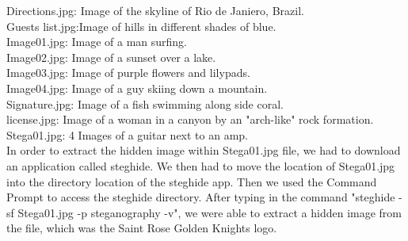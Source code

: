 \documentclass[12ptletterpaper]{paper}
\newcommand\tab[1][1cm]{\hspace*{#1}}
\begin{document}
\begin{flushleft}
		\tab Directions.jpg: Image of the skyline of Rio de Janiero, Brazil.\\
		\tab Guests list.jpg:Image of hills in different shades of blue.\\
		\tab Image01.jpg: Image of a man surfing.\\
		\tab Image02.jpg: Image of a sunset over a lake.\\
		\tab Image03.jpg: Image of purple flowers and lilypads.\\
		\tab Image04.jpg: Image of a guy skiing down a mountain.\\
		\tab Signature.jpg: Image of a fish swimming along side coral.\\
		\tab license.jpg: Image of a woman in a canyon by an "arch-like" rock formation.\\
		\tab Stega01.jpg: 4 Images of a guitar next to an amp.\\
		
		In order to extract the hidden image within Stega01.jpg file, we had to download an application called steghide. We then had to move the location of Stega01.jpg into the directory location of the steghide app. Then we used the Command Prompt to access the steghide directory. After typing in the command "steghide -sf Stega01.jpg -p steganography -v", we were able to extract a hidden image from the file, which was the Saint Rose Golden Knights logo.\\
		
		
	\end{flushleft}	
\end{document}
